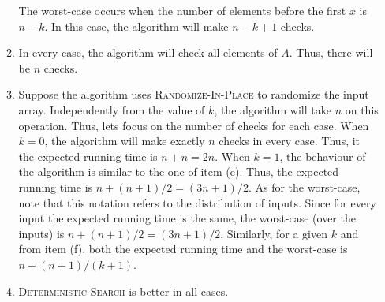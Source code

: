 \documentclass{report}
\makeatletter
\renewenvironment{framed}{%
 \def\FrameCommand##1{\hskip\@totalleftmargin
 \fboxsep=\FrameSep\fbox{##1}}%
 \MakeFramed {\advance\hsize-\width
   \@totalleftmargin\z@ \linewidth\hsize
   \@setminipage}}%
 {\par\unskip\endMakeFramed}
\makeatother
\begin{document}
\begin{enumerate}
\begin{framed}
\begin{enumerate}
The worst-case occurs when the number of elements before the first $x$ is
$n - k$. In this case, the algorithm will make $n - k + 1$ checks.

\item In every case, the algorithm will check all elements of $A$. Thus, there
will be $n$ checks.

\item Suppose the algorithm uses \textsc{Randomize-In-Place} to randomize the
input array. Independently from the value of $k$, the algorithm will take
$n$ on this operation. Thus, lets focus on the number of checks for each
case. When $k = 0$, the algorithm will make exactly $n$ checks in every case.
Thus, it the expected running time is $n + n = 2n$. When $k = 1$, the
behaviour of the algorithm is similar to the one of item (e). Thus, the expected
running time is $n + (n + 1)/2 = (3n + 1)/2$. As for the worst-case, note that
this notation refers to the distribution of inputs.  Since for every input the
expected running time is the same, the worst-case (over the inputs) is
$n + (n + 1)/2 = (3n + 1)/2$. Similarly, for a given $k$ and from item (f),
both the expected running time and the worst-case is $n + (n + 1)/(k + 1)$.

\item \textsc{Deterministic-Search} is better in all cases.
\end{enumerate}
\end{framed}

\end{enumerate}
\end{document}
